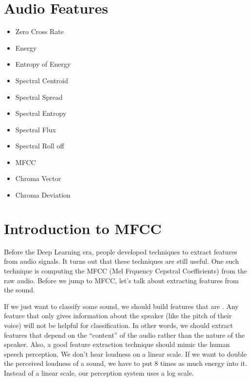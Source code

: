 \documentclass[letterpaper,10pt,english]{sphinxmanual}
\begin{document}
\section{Audio Features}
\label{\detokenize{AudioBasics:audio-features}}\label{\detokenize{AudioBasics:audio-features}}\begin{itemize}
\item {} 
Zero Cross Rate

\item {} 
Energy

\item {} 
Entropy of Energy

\item {} 
Spectral Centroid

\item {} 
Spectral Spread

\item {} 
Spectral Entropy

\item {} 
Spectral Flux

\item {} 
Spectral Roll off

\item {} 
MFCC

\item {} 
Chroma Vector

\item {} 
Chroma Deviation

\end{itemize}


\section{Introduction to MFCC}
\label{\detokenize{AudioBasics:introduction-to-mfcc}}\label{\detokenize{AudioBasics:introduction-to-mfcc}}
Before the Deep Learning era, people developed techniques to extract features from audio signals. It turns out that these techniques are still useful. One such technique is computing the MFCC (Mel Frquency Cepstral Coefficients) from the raw audio. Before we jump to MFCC, let’s talk about extracting features from the sound.

If we just want to classify some sound, we should build features that are . Any feature that only gives information about the speaker (like the pitch of their voice) will not be helpful for classification. In other words, we should extract features that depend on the “content” of the audio rather than the nature of the speaker. Also, a good feature extraction technique should mimic the human speech perception. We don’t hear loudness on a linear scale. If we want to double the perceived loudness of a sound, we have to put 8 times as much energy into it. Instead of a linear scale, our perception system uses a log scale.
\end{document}
